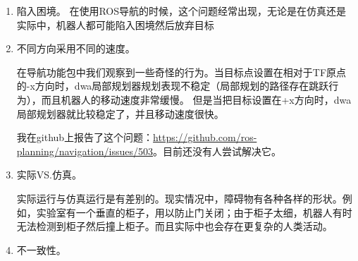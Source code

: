 \begin{enumerate}
	\item 陷入困境。 %
	在使用ROS导航的时候，这个问题经常出现，无论是在仿真还是实际中，机器人都可能陷入困境然后放弃目标
	
	\item 不同方向采用不同的速度。%
	
	在导航功能包中我们观察到一些奇怪的行为。当目标点设置在相对于TF原点的-x方向时，dwa局部规划器规划表现不稳定（局部规划的路径存在跳跃行为），而且机器人的移动速度非常缓慢。
	但是当把目标设置在+x方向时，dwa局部规划器就比较稳定了，并且移动速度很快。
	
	我在github上报告了这个问题：\url{https://github.com/ros-planning/navigation/issues/503}。目前还没有人尝试解决它。
	
	\item 实际VS.仿真。 %
	
	
	实际运行与仿真运行是有差别的。现实情况中，障碍物有各种各样的形状。例如，实验室有一个垂直的柜子，用以防止门关闭；由于柜子太细，机器人有时无法检测到柜子然后撞上柜子。而且实际中也会存在更复杂的人类活动。
	
	\item 不一致性。%
	
	

\end{enumerate}
